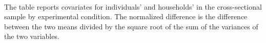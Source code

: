 \\
\begin{minipage}{1\linewidth}
\scriptsize  The table reports  covariates for individuals' and households' in the cross-sectional sample by experimental condition. The normalized difference is the difference between the two means divided by the square root of the sum of the variances of the two variables.\\
\end{minipage}

